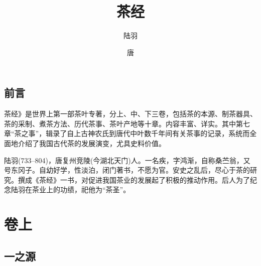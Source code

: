 \documentclass[12pt,UTF8]{ctexbook}
\title{\heiti\zihao{0} 茶经}
\author{陆羽}
\date{唐}
\begin{document}
\maketitle
\tableofcontents

\frontmatter

\chapter{前言}

茶经》是世界上第一部茶叶专著，分上、中、下三卷，包括茶的本源、制茶器具、茶的采制、煮茶方法、历代茶事、茶叶产地等十章。内容丰富、详实。其中第七章“茶之事”，辑录了自上古神农氏到唐代中叶数千年间有关茶事的记录，系统而全面地介绍了我国古代茶的发展演变，尤具史料价值。　

陆羽(733--804)，唐复州竞陵(今湖北天门)人。一名疾，字鸿渐，自称桑苎翁，又号东冈子。自幼好学，性淡泊，闭门著书，不愿为官。安史之乱后，尽心于茶的研究。撰成《茶经》一书，对促进我国茶业的发展起了积极的推动作用。后人为了纪念陆羽在茶业上的功绩，祀他为“茶圣”。

\mainmatter

\part{卷上}

\chapter{一之源}
\end{document}
